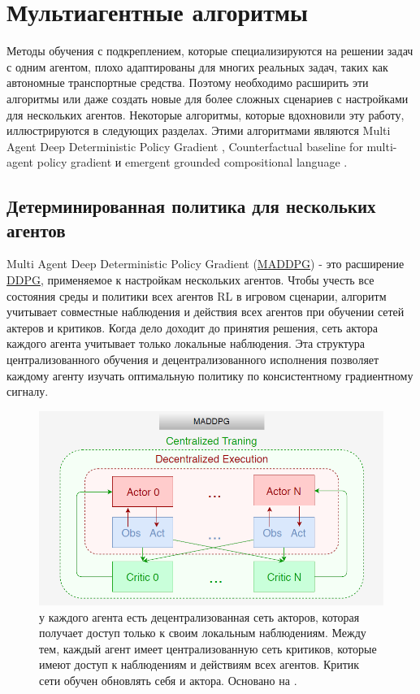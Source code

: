 \section{Мультиагентные алгоритмы} \label{ch2:ma-algs} %

Методы обучения с подкреплением, которые специализируются на решении задач с одним агентом, плохо адаптированы для многих реальных задач, таких как автономные транспортные средства. Поэтому необходимо расширить эти алгоритмы или даже создать новые для более сложных сценариев с настройками для нескольких агентов.
Некоторые алгоритмы, которые вдохновили эту работу, иллюстрируются в следующих разделах. Этими алгоритмами являются Multi Agent Deep Deterministic Policy Gradient \cite{lowe2017multiagent}, Counterfactual baseline for multi-agent policy gradient \cite{foerster2017counterfactual} и emergent grounded compositional language \cite{mordatch2017emergence}.

\subsection{Детерминированная политика для нескольких агентов}

Multi Agent Deep Deterministic Policy Gradient (\hyperref[acr:maddpg]{MADDPG}) - это расширение \hyperref[acr:ddpg]{DDPG}, применяемое к настройкам нескольких агентов. Чтобы учесть все состояния среды и политики всех агентов RL в игровом сценарии, алгоритм учитывает совместные наблюдения и действия всех агентов при обучении сетей актеров и критиков. Когда дело доходит до принятия решения, сеть актора каждого агента учитывает только локальные наблюдения. Эта структура централизованного обучения и децентрализованного исполнения позволяет каждому агенту изучать оптимальную политику по консистентному градиентному сигналу. \cite{lowe2017multiagent}

\begin{figure}[ht!]
    \center
    \includegraphics [scale=0.80] {my_folder/images/ch2/maddpg.png}
    \caption{у каждого агента есть децентрализованная сеть акторов, которая получает доступ только к своим локальным наблюдениям. Между тем, каждый агент имеет централизованную сеть критиков, которые имеют доступ к наблюдениям и действиям всех агентов. Критик сети обучен обновлять себя и актора. Основано на \cite{lowe2017multiagent}.}
    \label{fig:ch2-maddpg}
\end{figure} %


